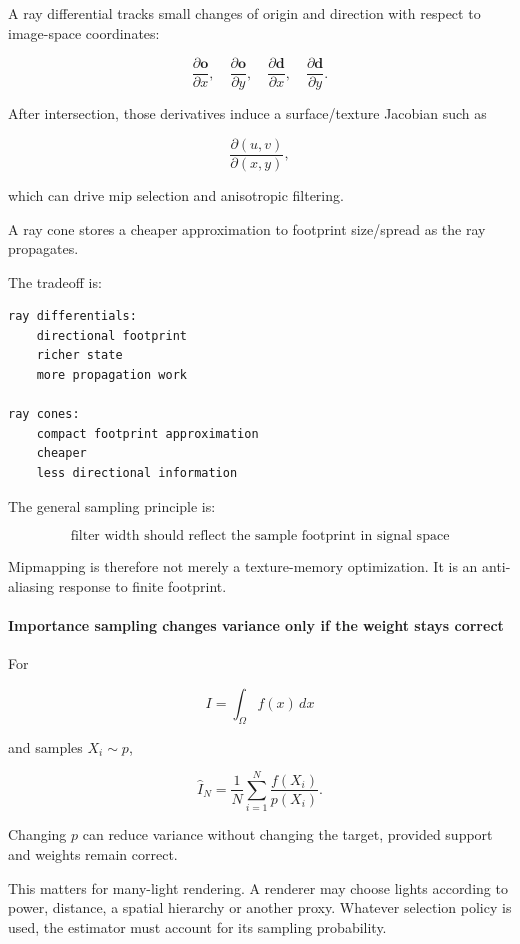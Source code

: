 A ray differential tracks small changes of origin and direction with respect to image-space coordinates:

\[
\frac{\partial \mathbf o}{\partial x},
\quad
\frac{\partial \mathbf o}{\partial y},
\quad
\frac{\partial \mathbf d}{\partial x},
\quad
\frac{\partial \mathbf d}{\partial y}.
\]

After intersection, those derivatives induce a surface/texture Jacobian such as

\[
\frac{\partial(u,v)}{\partial(x,y)},
\]

which can drive mip selection and anisotropic filtering.

A ray cone stores a cheaper approximation to footprint size/spread as the ray propagates.

The tradeoff is:

\begin{verbatim}
ray differentials:
    directional footprint
    richer state
    more propagation work

ray cones:
    compact footprint approximation
    cheaper
    less directional information
\end{verbatim}

The general sampling principle is:

\[
\boxed{
\text{filter width should reflect the sample footprint in signal space}
}
\]

Mipmapping is therefore not merely a texture-memory optimization. It is an anti-aliasing response to finite footprint.

\paragraph{Importance sampling changes variance only if the weight stays correct}\label{03-visual-computing-i-ch001-importance-sampling-changes-variance-only-if-the-weight-stays-correct}

\hypertarget{03-visual-computing-i-ch001-importance-sampling-changes-variance-only-if-the-weight-stays-correct}{}

For

\[
I=\int_\Omega f(x)\,dx
\]

and samples \(X_i\sim p\),

\[
\widehat I_N=
\frac1N
\sum_{i=1}^{N}
\frac{f(X_i)}{p(X_i)}.
\]

Changing \(p\) can reduce variance without changing the target, provided support and weights remain correct.

This matters for many-light rendering. A renderer may choose lights according to power, distance, a spatial hierarchy or another proxy. Whatever selection policy is used, the estimator must account for its sampling probability.

